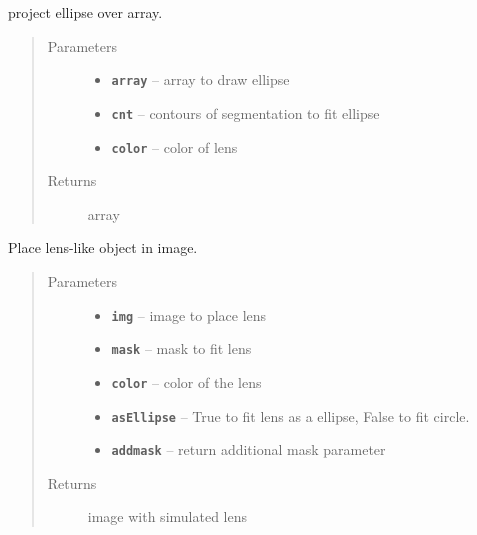 \documentclass[letterpaper,10pt,english]{sphinxmanual}
\begin{document}
\begin{fulllineitems}
\label{RRtoolbox.tools:RRtoolbox.tools.lens.drawEllipse}
project ellipse over array.
\begin{quote}\begin{description}
\item[{Parameters}] \leavevmode\begin{itemize}
\item {} 
\textbf{\texttt{array}} -- array to draw ellipse

\item {} 
\textbf{\texttt{cnt}} -- contours of segmentation to fit ellipse

\item {} 
\textbf{\texttt{color}} -- color of lens

\end{itemize}

\item[{Returns}] \leavevmode
array

\end{description}\end{quote}

\end{fulllineitems}


\begin{fulllineitems}
\label{RRtoolbox.tools:RRtoolbox.tools.lens.fitLens}
Place lens-like object in image.
\begin{quote}\begin{description}
\item[{Parameters}] \leavevmode\begin{itemize}
\item {} 
\textbf{\texttt{img}} -- image to place lens

\item {} 
\textbf{\texttt{mask}} -- mask to fit lens

\item {} 
\textbf{\texttt{color}} -- color of the lens

\item {} 
\textbf{\texttt{asEllipse}} -- True to fit lens as a ellipse, False to fit circle.

\item {} 
\textbf{\texttt{addmask}} -- return additional mask parameter

\end{itemize}

\item[{Returns}] \leavevmode
image with simulated lens

\end{description}\end{quote}

\end{fulllineitems}
\end{document}
